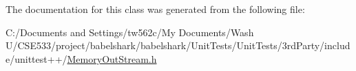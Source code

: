 The documentation for this class was generated from the following file:\begin{CompactItemize}
\item 
C:/Documents and Settings/tw562c/My Documents/Wash U/CSE533/project/babelshark/babelshark/UnitTests/UnitTests/3rdParty/include/unittest++/\hyperlink{_memory_out_stream_8h}{MemoryOutStream.h}\end{CompactItemize}
